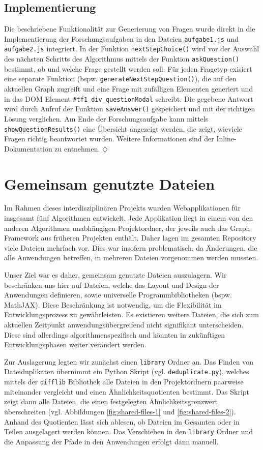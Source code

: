 \subsection*{Implementierung} %
Die beschriebene Funktionalität zur Generierung von Fragen wurde direkt in die Implementierung der Forschungsaufgaben in den Dateien \texttt{aufgabe1.js} und \texttt{aufgabe2.js} integriert. In der Funktion \texttt{nextStepChoice()} wird vor der Auswahl des nächsten Schritts des Algorithmus mittels der Funktion \texttt{askQuestion()} bestimmt, ob und welche Frage gestellt werden soll. Für jeden Fragetyp exisiert eine separate Funktion (bspw. \texttt{generateNextStepQuestion()}), die auf den aktuellen Graph zugreift und eine Frage mit zufälligen Elementen generiert und in das DOM Element \texttt{\#tf1\_div\_questionModal} schreibt. Die gegebene Antwort wird durch Aufruf der Funktion \texttt{saveAnswer()} gespeichert und mit der richtigen Lösung verglichen. Am Ende der Forschungsaufgabe kann mittels \texttt{showQuestionResults()} eine Übersicht angezeigt werden, die zeigt, wieviele Fragen richtig beantwortet wurden. Weitere Informationen sind der Inline-Dokumentation zu entnehmen. \hfill$\diamondsuit$

\section{Gemeinsam genutzte Dateien} %
Im Rahmen dieses interdisziplinären Projekts wurden Webapplikationen für insgesamt fünf Algorithmen entwickelt. Jede Applikation liegt in einem von den anderen Algorithmen unabhängigen Projektordner, der jeweils auch das Graph Framework aus früheren Projekten enthält. Daher lagen im gesamten Repository viele Dateien mehrfach vor. Dies war insofern problematisch, da Änderungen, die alle Anwendungen betreffen, in mehreren Dateien vorgenommen werden mussten.

Unser Ziel war es daher, gemeinsam genutzte Dateien auszulagern. Wir beschränken uns hier auf Dateien, welche das Layout und Design der Anwendungen definieren, sowie universelle Programmbibliotheken (bspw. MathJAX). Diese Beschränkung ist notwendig, um die Flexibilität im Entwicklungsprozess zu gewährleisten. Es existieren weitere Dateien, die sich zum aktuellen Zeitpunkt anwendungsübergreifend nicht signifikant unterscheiden. Diese sind allerdings algorithmenspezifisch und könnten in zukünftigen Entwicklungsphasen weiter verändert werden.

Zur Auslagerung legten wir zunächst einen \texttt{library} Ordner an. Das Finden von Dateiduplikaten übernimmt ein Python Skript (vgl. \texttt{deduplicate.py}), welches mittels der \texttt{difflib} Bibliothek alle Dateien in den Projektordnern paarweise miteinander vergleicht und einen Ähnlichkeitsquotienten bestimmt. Das Skript zeigt dann alle Dateien, die einen festgelegten Ähnlichkeitsgrenzwert überschreiten (vgl. Abbildungen \ref{fig:shared-files-1} und \ref{fig:shared-files-2}). Anhand des Quotienten lässt sich ablesen, ob Dateien im Gesamten oder in Teilen ausgelagert werden können. Das Verschieben in den \texttt{library} Ordner und die Anpassung der Pfade in den Anwendungen erfolgt dann manuell.

